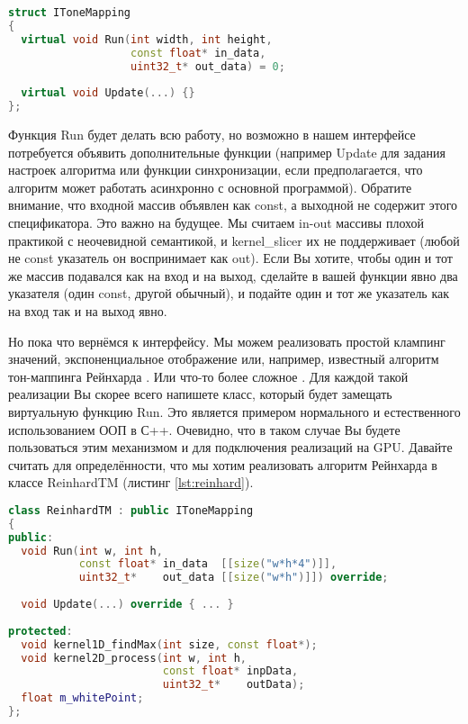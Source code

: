 \documentclass[11pt,fleqn,english,russian]{report} %
\begin{document}
\begin{lstlisting}[language=C++, caption=интерфейс алгоритмов тон-маппинга]
struct IToneMapping
{
  virtual void Run(int width, int height, 
                   const float* in_data,
                   uint32_t* out_data) = 0;
                   
  virtual void Update(...) {}                 
};
\end{lstlisting}\label{lst:tonemapping_api2}

Функция Run будет делать всю работу, но возможно в нашем интерфейсе потребуется объявить дополнительные функции (например Update для задания настроек алгоритма или функции синхронизации, если предполагается, что алгоритм может работать асинхронно с основной программой). Обратите внимание, что входной массив объявлен как const, а выходной не содержит этого спецификатора. Это важно на будущее. Мы считаем in-out массивы плохой практикой с неочевидной семантикой, и kernel\_slicer их не поддерживает (любой не const указатель он воспринимает как out). Если Вы хотите, чтобы один и тот же массив подавался как на вход и на выход, сделайте в вашей функции явно два указателя (один const, другой обычный), и подайте один и тот же указатель как на вход так и на выход явно.  

Но пока что вернёмся к интерфейсу. Мы можем реализовать простой клампинг значений, экспоненциальное отображение или, например, известный алгоритм тон-маппинга Рейнхарда \cite{Reinhard05}. Или что-то более сложное \cite{Mantiuk08}. Для каждой такой реализации Вы скорее всего напишете класс, который будет замещать виртуальную функцию Run. Это является примером нормального и естественного использованием ООП в С++. Очевидно, что в таком случае Вы будете пользоваться этим механизмом и для подключения реализаций на GPU. Давайте считать для определённости, что мы хотим реализовать алгоритм Рейнхарда в классе ReinhardTM (листинг \ref{lst:reinhard}).

\begin{lstlisting}[language=C++, 
	               caption=класс для алгоритма Рейнхарда, 
	               label=lst:reinhard]	
class ReinhardTM : public IToneMapping
{
public:
  void Run(int w, int h, 
           const float* in_data  [[size("w*h*4")]], 
           uint32_t*    out_data [[size("w*h")]]) override;
		   
  void Update(...) override { ... }
   	
protected:
  void kernel1D_findMax(int size, const float*);
  void kernel2D_process(int w, int h, 
                        const float* inpData, 
                        uint32_t*    outData);
  float m_whitePoint;
};
\end{lstlisting}
\end{document}

